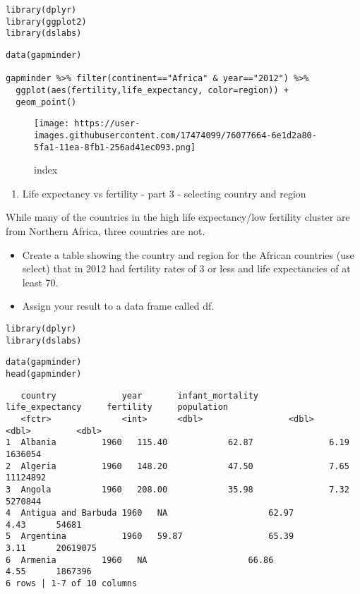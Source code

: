 \documentclass[]{article}
\providecommand{\tightlist}{%
  \setlength{\itemsep}{0pt}\setlength{\parskip}{0pt}}
\begin{document}
\begin{verbatim}
library(dplyr)
library(ggplot2)
library(dslabs)
\end{verbatim}

\begin{verbatim}
data(gapminder)

gapminder %>% filter(continent=="Africa" & year=="2012") %>%
  ggplot(aes(fertility,life_expectancy, color=region)) +
  geom_point()
\end{verbatim}

\begin{figure}
\centering
\texttt{[image: https://user-images.githubusercontent.com/17474099/76077664-6e1d2a80-5fa1-11ea-8fb1-256ad41ec093.png]}
\caption{index}
\end{figure}

\begin{enumerate}
\def\labelenumi{\arabic{enumi}.}
\setcounter{enumi}{2}
\tightlist
\item
  Life expectancy vs fertility - part 3 - selecting country and region
\end{enumerate}

While many of the countries in the high life expectancy/low fertility
cluster are from Northern Africa, three countries are not.

\begin{itemize}
\tightlist
\item
  Create a table showing the country and region for the African
  countries (use select) that in 2012 had fertility rates of 3 or less
  and life expectancies of at least 70.
\item
  Assign your result to a data frame called df.
\end{itemize}

\begin{verbatim}
library(dplyr)
library(dslabs)
\end{verbatim}

\begin{verbatim}
data(gapminder)
head(gapminder)
\end{verbatim}

\begin{verbatim}
   country             year       infant_mortality      life_expectancy     fertility     population
   <fctr>              <int>      <dbl>                 <dbl>               <dbl>         <dbl>
1  Albania         1960   115.40            62.87               6.19      1636054   
2  Algeria         1960   148.20            47.50               7.65      11124892  
3  Angola          1960   208.00            35.98               7.32      5270844   
4  Antigua and Barbuda 1960   NA                    62.97               4.43      54681 
5  Argentina           1960   59.87                 65.39               3.11      20619075  
6  Armenia         1960   NA                    66.86               4.55      1867396   
6 rows | 1-7 of 10 columns
\end{verbatim}
\end{document}
